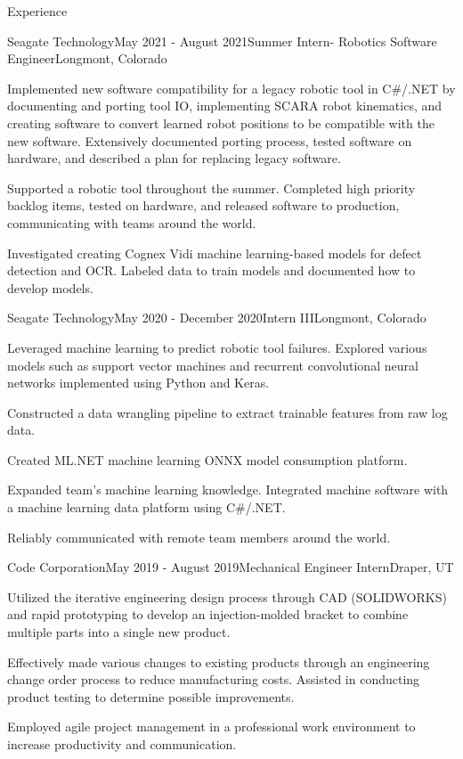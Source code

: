 \documentclass{resume}
\begin{document}
\begin{rSection}{Experience}
    \begin{rSubsection}{Seagate Technology}{May 2021 - August 2021}{Summer Intern- Robotics Software Engineer}{Longmont, Colorado}
    \item Implemented new software compatibility for a legacy robotic tool in  C\#/.NET by documenting and porting tool IO, implementing SCARA robot kinematics, and creating software to convert learned robot positions to be compatible with the new software. 
    Extensively documented porting process, tested software on hardware, and described a plan for replacing legacy software.
    \item Supported a robotic tool throughout the summer. Completed high priority backlog items, tested on hardware, and released software to production, communicating with teams around the world.
    \item Investigated creating Cognex Vidi machine learning-based models for defect detection and OCR. Labeled data to train models and documented how to develop models.
    \end{rSubsection}
  
    \begin{rSubsection}{Seagate Technology}{May 2020 - December 2020}{Intern III}{Longmont, Colorado}
    \item Leveraged machine learning to predict robotic tool failures. 
    Explored various models such as support vector machines and recurrent convolutional neural networks implemented using Python and Keras. 
    \item Constructed a data wrangling pipeline to extract trainable features from raw log data. 
    \item Created ML.NET machine learning ONNX model consumption platform.
    \item Expanded team’s machine learning knowledge. Integrated machine software with a machine learning data platform using C\#/.NET.
    \item Reliably communicated with remote team members around the world.
    \end{rSubsection}

    \begin{rSubsection}{Code Corporation}{May 2019 - August 2019}{Mechanical Engineer Intern}{Draper, UT}
    \item Utilized the iterative engineering design process through CAD (SOLIDWORKS) and rapid prototyping to develop an injection-molded bracket to combine multiple parts into a single new product.  
    \item Effectively made various changes to existing products through an engineering change order process to reduce manufacturing costs.  Assisted in conducting product testing to determine possible improvements.  
    \item Employed agile project management in a professional work environment to increase productivity and communication.
    \end{rSubsection}
 
  \end{rSection}
\end{document}
